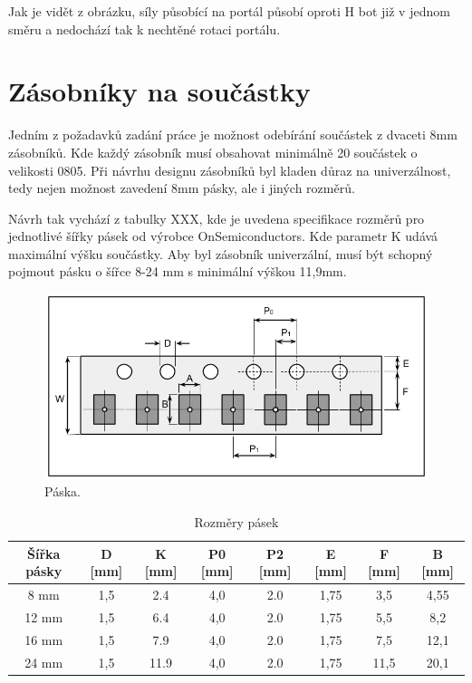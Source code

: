 Jak je vidět z obrázku, síly působící na portál působí oproti H bot již v jednom směru a nedochází tak k nechtěné rotaci portálu. 


\section{Zásobníky na součástky}
Jedním z požadavků zadání práce je možnost odebírání součástek z dvaceti 8mm zásobníků. Kde každý zásobník musí obsahovat minimálně 20 součástek o velikosti 0805. Při návrhu designu zásobníků byl kladen důraz na univerzálnost, tedy nejen možnost zavedení 8mm pásky, ale i jiných rozměrů.

Návrh tak vychází z tabulky XXX, kde je uvedena specifikace rozměrů pro jednotlivé šířky pásek od výrobce OnSemiconductors. Kde parametr K udává maximální výšku součástky. Aby byl zásobník univerzální, musí být schopný pojmout pásku o šířce 8-24 mm s minimální výškou 11,9mm.

\begin{figure}[h!]
  \centering
    \includegraphics[width=0.8\linewidth]{obrazky/tape.png}%
    \caption{Páska.}
    \label{fig:tape2}
\end{figure}


\begin{table}[h!]
  \caption{Rozměry pásek}
  \begin{center}
  	\small
	  \begin{tabular}{|c|c|c|c|c|c|c|c|}
	    \hline
	    Šířka pásky	& D [mm]	& K [mm]	& P0 [mm]	& P2 [mm]	& E [mm]	& F [mm]	& B [mm]	\\
	    \hline\hline
		8 mm	& 1,5		& 2.4		& 4,0		& 2.0		& 1,75		& 3,5		& 4,55		\\
	    	\hline
		12 mm	& 1,5		& 6.4		& 4,0		& 2.0		& 1,75		& 5,5		& 8,2		\\
	    	\hline
		16 mm	& 1,5		& 7.9		& 4,0		& 2.0		& 1,75		& 7,5		& 12,1		\\
	    	\hline
		24 mm	& 1,5		& 11.9		& 4,0		& 2.0		& 1,75		& 11,5		& 20,1		\\
	    	\hline
	  \end{tabular}
  \end{center}
\end{table}

